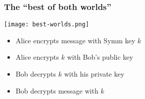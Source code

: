\documentclass[
hyperref={pdfpagelabels=false}
,xcolor=table
]
{beamer}
\begin{document}
\begin{frame}
  \frametitle{The ``best of both worlds''}

  \begin{center}
    \texttt{[image: best-worlds.png]}
  \end{center}

  
  \begin{itemize}
  \item Alice encrypts message with Symm key $k$
  \item Alice encrypts $k$ with Bob's public key
  \item Bob decrypts $k$ with his private key
  \item Bob decrypts message with $k$
  \end{itemize}
  
\end{frame}
\end{document}

